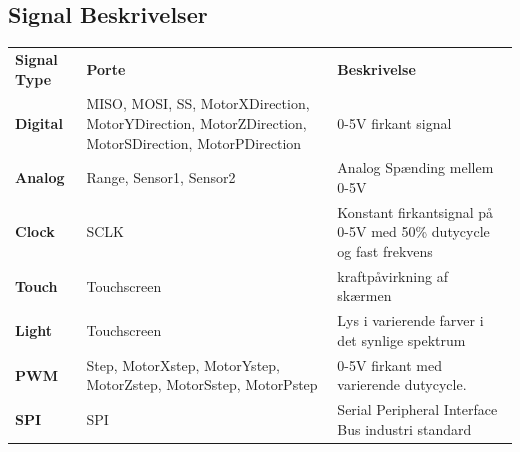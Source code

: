 \subsection{Signal Beskrivelser}

\begin{tabular}{>{\bfseries}p{50pt}  p{110pt}  p{170pt}}
	Signal Type & \textbf{Porte} & \textbf{Beskrivelse} \\
	Digital & MISO, MOSI, SS, MotorXDirection, MotorYDirection, MotorZDirection, MotorSDirection, MotorPDirection & 0-5V firkant signal \\
	Analog & Range, Sensor1, Sensor2 & Analog Spænding mellem 0-5V \\
	Clock & SCLK & Konstant firkantsignal på 0-5V med 50\% dutycycle og fast frekvens \\
	Touch & Touchscreen & kraftpåvirkning af skærmen \\
	Light & Touchscreen & Lys i varierende farver i det synlige spektrum \\
	PWM & Step, MotorXstep, MotorYstep, MotorZstep, MotorSstep, MotorPstep & 0-5V firkant med varierende dutycycle. \\
	SPI & SPI & Serial Peripheral Interface Bus industri standard \\
\end{tabular}